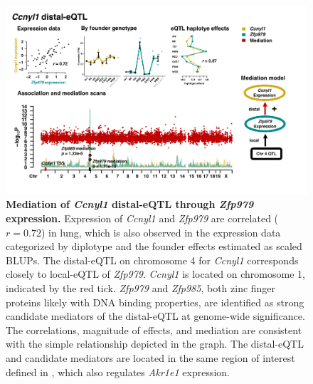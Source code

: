 \documentclass[9pt,twocolumn,twoside]{gsajnl}
\begin{document}
\begin{figure}[hp]
\renewcommand{\familydefault}{\sfdefault}\normalfont
\centering
\includegraphics[width=\textwidth, trim={0in 0.5in 0in 0in}, clip]{figs/ccnyl1_mediation.png}
\caption{\textbf{Mediation of \textit{Ccnyl1} distal-eQTL through \textit{Zfp979} expression.} 
Expression of \textit{Ccnyl1} and \textit{Zfp979} are correlated ($r = 0.72$) in lung, which is also observed in the expression data categorized by diplotype and the founder effects estimated as scaled BLUPs. The distal-eQTL on chromosome 4 for \textit{Ccnyl1} corresponds closely to local-eQTL of \textit{Zfp979}. \textit{Ccnyl1} is located on chromosome 1, indicated by the red tick. \textit{Zfp979} and \textit{Zfp985}, both zinc finger proteins likely with DNA binding properties, are identified as strong candidate mediators of the distal-eQTL at genome-wide significance. The correlations, magnitude of effects, and mediation are consistent with the simple relationship depicted in the graph. The distal-eQTL and candidate mediators are located in the same region of interest defined in \cite{HamiltonWilliams2013}, which also regulates \textit{Akr1e1} expression. 
\label{fig:ccnyl1_exmediation}}
\end{figure}

\clearpage
\end{document}

